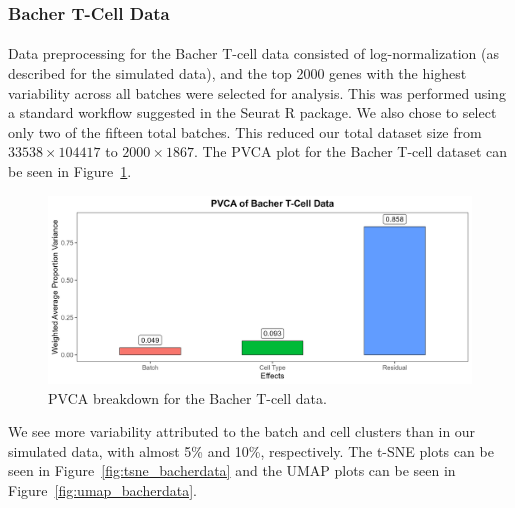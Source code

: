 \documentclass[unnumsec,webpdf,contemporary,large]{oup-authoring-template}%
\theoremstyle{thmstyleone}%
\theoremstyle{thmstyletwo}%
\theoremstyle{thmstylethree}%
\begin{document}
\subsubsection*{Bacher T-Cell Data}

\paragraph*{}
Data preprocessing for the Bacher T-cell data consisted of log-normalization (as described for the simulated data), and the top 2000 genes with the highest variability across all batches were selected for analysis. This was performed using a standard workflow suggested in the Seurat R package. We also chose to select only two of the fifteen total batches. This reduced our total dataset size from $33538 \times 104417$ to $2000 \times 1867$. The PVCA plot for the Bacher T-cell dataset can be seen in Figure~\ref{fig:pvca_bacherdata}.

\begin{figure}[ht]
    \centering 
    \includegraphics[width=1\columnwidth]{pvca_bacherdata} 
    \caption[PVCA Breakdown for the Bacher T-Cell Data]{PVCA breakdown for the Bacher T-cell data.}
    \label{fig:pvca_bacherdata} 
\end{figure}

We see more variability attributed to the batch and cell clusters than in our simulated data, with almost 5\% and 10\%, respectively. The t-SNE plots can be seen in Figure~\ref{fig:tsne_bacherdata} and the UMAP plots can be seen in Figure~\ref{fig:umap_bacherdata}.
\end{document}
